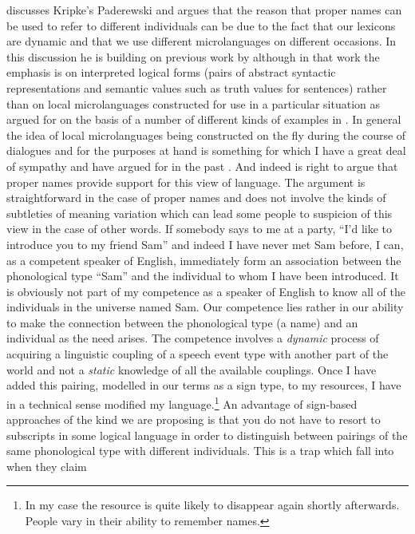 \cite{Ludlow2014} discusses Kripke's Paderewski and
argues that the reason that proper names can be used to refer to
different individuals can be due to the fact that our lexicons are
dynamic and that we use different microlanguages on different
occasions.  In this discussion he is building on previous work by
\cite{LarsonLudlow1993} although in that work the emphasis is on
interpreted logical forms (pairs of abstract syntactic representations
and semantic values such as truth values for sentences) rather than on
local microlanguages constructed for use in a particular situation as
argued for on the basis of a number of different kinds of examples in
\cite{Ludlow2014}.  In general the idea of local microlanguages being
constructed on the fly during the course of dialogues and for the
purposes at hand is something for which I have a great deal of
sympathy and have argued for in the past
\citep{CooperRanta2008,LarssonCooper2009,Cooper2010,Cooper2012}.  And
indeed \cite{Ludlow2014} is right to argue that proper names provide
support for this view of language.  The argument is straightforward in
the case of proper names and does not involve the kinds of subtleties
of meaning variation which can lead some people to suspicion of this view in the
case of other words. If somebody says to me at a party, ``I'd like to
introduce you to my friend Sam'' and indeed I have never met Sam
before, I can, as a competent speaker of English, immediately form an
association between the phonological type ``Sam'' and the individual
to whom I have been introduced.  It is obviously not part of my
competence as a speaker of English to know all of the individuals in
the universe named Sam.  Our competence lies rather in our ability to
make the connection between the phonological type (a name) and an
individual as the need arises.  The competence involves a
\textit{dynamic} process of acquiring a linguistic coupling of a
speech event type with another part of the world and not a \textit{static}
knowledge of all the available couplings.  Once I have added this
pairing, modelled in our terms as a sign type, to my resources, I have in a technical
sense modified my language.\footnote{In my case the resource is quite
  likely to disappear again shortly afterwards.  People vary in their
  ability to remember names.}  An advantage of sign-based approaches of
the kind we are proposing is that you do not have to resort to
subscripts in some logical language in order to distinguish between
pairings of the same phonological type with different individuals.
This is a trap which \cite{LarsonLudlow1993} fall into when they claim
